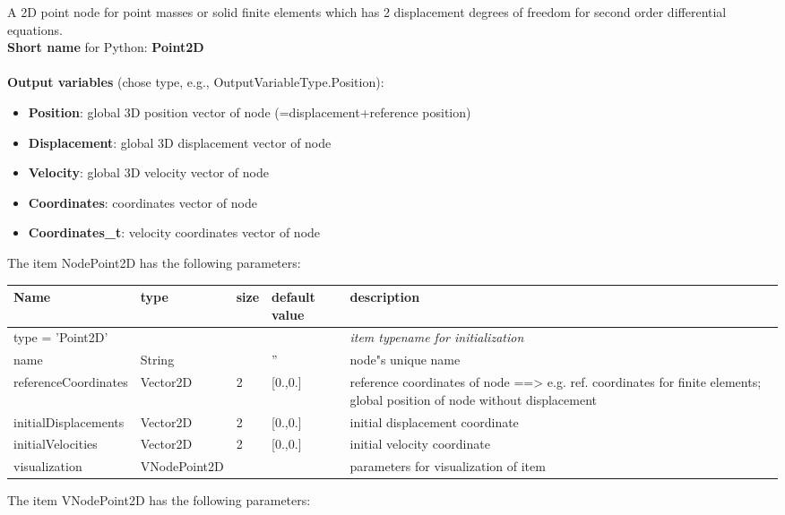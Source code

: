A 2D point node for point masses or solid finite elements which has 2 displacement degrees of freedom for second order differential equations.
 \\
{\bf Short name} for Python: {\bf Point2D}
 \\\\ 
{\bf Output variables} (chose type, e.g., OutputVariableType.Position): 
\begin{itemize}
    \item {\bf Position}: global 3D position vector of node (=displacement+reference position)
    \item {\bf Displacement}: global 3D displacement vector of node
    \item {\bf Velocity}: global 3D velocity vector of node
    \item {\bf Coordinates}: coordinates vector of node
    \item {\bf Coordinates\_t}: velocity coordinates vector of node
\end{itemize}
The item NodePoint2D has the following parameters:
\begin{center}
  \footnotesize
  \begin{longtable}{| p{4.5cm} | p{2.5cm} | p{0.5cm} | p{2.5cm} | p{6cm} |}
    \hline
    \bf Name & \bf type & \bf size & \bf default value & \bf description \\ \hline
    \multicolumn{4}{l}{\parbox{10cm}{type = 'Point2D'}} & \multicolumn{1}{l}{\parbox{6cm}{\it item typename for initialization}}\\ \hline
    name &     String &      &     '' &     node"s unique name\\ \hline
    referenceCoordinates &     Vector2D &     2 &     [0.,0.] &     reference coordinates of node ==> e.g. ref. coordinates for finite elements; global position of node without displacement\\ \hline
    initialDisplacements &     Vector2D &     2 &     [0.,0.] &     initial displacement coordinate\\ \hline
    initialVelocities &     Vector2D &     2 &     [0.,0.] &     initial velocity coordinate\\ \hline
    visualization & VNodePoint2D & & & parameters for visualization of item \\ \hline
	  \end{longtable}
	\end{center}
The item VNodePoint2D has the following parameters:
